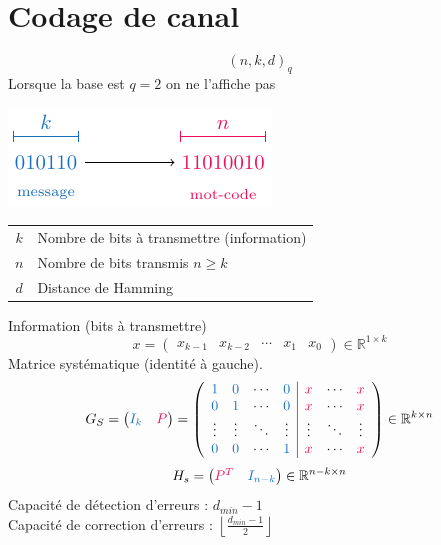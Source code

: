 \documentclass[resume.tex]{subfiles}
\begin{document}
\section{Codage de canal}
$$(n,k,d)_q$$
Lorsque la base est $q=2$ on ne l'affiche pas
\begin{center}
\includegraphics[scale=1,page=1]{drwg_1.pdf}
\end{center}
\begin{center}
\begin{tabular}{c|l}
$k$ & Nombre de bits à transmettre (information)\\
$n$ & Nombre de bits transmis $n\geq k$\\
$d$ & Distance de Hamming
\end{tabular}
\end{center}
Information (bits à transmettre)
$$x=\begin{pmatrix}
x_{k-1} &
x_{k-2} &
\cdots &
x_1 &
x_0
\end{pmatrix}\in \mathbb{R}^{1\times k}$$
Matrice systématique (identité à gauche).
$$G_S=\begin{pmatrix}
\textcolor{RoyalBlue}{I_k} & \textcolor{OrangeRed}{P}
\end{pmatrix}=
\left(\begin{array}{cccc|cccc}
\textcolor{RoyalBlue}{1} & \textcolor{RoyalBlue}{0} & \cdots & \textcolor{RoyalBlue}{0} & \textcolor{OrangeRed}{x} & \cdots & \textcolor{OrangeRed}{x}\\
\textcolor{RoyalBlue}{0} & \textcolor{RoyalBlue}{1} & \cdots & \textcolor{RoyalBlue}{0} & \textcolor{OrangeRed}{x} & \cdots & \textcolor{OrangeRed}{x}\\
\vdots & \vdots & \ddots & \vdots & \vdots & \ddots & \vdots\\
\textcolor{RoyalBlue}{0} & \textcolor{RoyalBlue}{0} & \cdots & \textcolor{RoyalBlue}{1} & \textcolor{OrangeRed}{x} & \cdots & \textcolor{OrangeRed}{x}
\end{array}\right)\in\mathbb{R}^{k\times n}$$
$$H_s=\begin{pmatrix}
\textcolor{OrangeRed}{P^{T}} & \textcolor{RoyalBlue}{I_{n-k}}
\end{pmatrix}\in\mathbb{R}^{n-k\times n}$$
Capacité de détection d'erreurs : $d_{min}-1$\\
Capacité de correction d'erreurs : $\left\lfloor\frac{d_{min}-1}{2}\right\rfloor$
\end{document}
